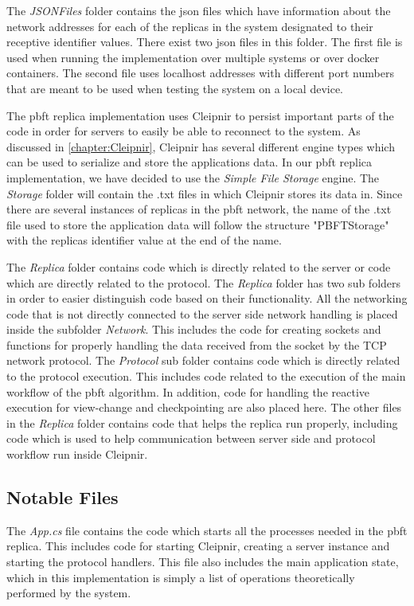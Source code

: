 The \emph{JSONFiles} folder contains the \ac{json} files which have information about the network addresses for each of the replicas in the system designated to their receptive identifier values. There exist two \ac{json} files in this folder. The first file is used when running the implementation over multiple systems or over docker containers. The second file uses localhost addresses with different port numbers that are meant to be used when testing the system on a local device.

The \ac{pbft} replica implementation uses Cleipnir to persist important parts of the code in order for servers to easily be able to reconnect to the system. As discussed in \autoref{chapter:Cleipnir}, Cleipnir has several different engine types which can be used to serialize and store the applications data. In our \ac{pbft} replica implementation, we have decided to use the \emph{Simple File Storage} engine. The \emph{Storage} folder will contain the .txt files in which Cleipnir stores its data in. Since there are several instances of replicas in the \ac{pbft} network, the name of the .txt file used to store the application data will follow the structure "PBFTStorage" with the replicas identifier value at the end of the name.

The \emph{Replica} folder contains code which is directly related to the server or code which are directly related to the protocol. The \emph{Replica} folder has two sub folders in order to easier distinguish code based on their functionality. All the networking code that is not directly connected to the server side network handling is placed inside the subfolder \emph{Network}. This includes the code for creating sockets and functions for properly handling the data received from the socket by the TCP network protocol.
The \emph{Protocol} sub folder contains code which is directly related to the protocol execution. This includes code related to the execution of the main workflow of the \ac{pbft} algorithm. In addition, code for handling the reactive execution for view-change and checkpointing are also placed here.
The other files in the \emph{Replica} folder contains code that helps the replica run properly, including code which is used to help communication between server side and protocol workflow run inside Cleipnir.

\subsection{Notable Files}
The \emph{App.cs} file contains the code which starts all the processes needed in the \ac{pbft} replica. This includes code for starting Cleipnir, creating a server instance and starting the protocol handlers. This file also includes the main application state, which in this implementation is simply a list of operations theoretically performed by the system.

